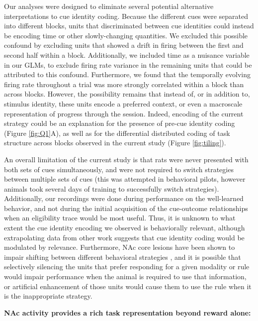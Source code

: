 \documentclass[11pt]{article}
\let\cite=\citep
\begin{document}
Our analyses were designed to eliminate several potential alternative
interpretations to cue identity coding. Because the different cues
were separated into different blocks, units that discriminated between
cue identities could instead be encoding time or other slowly-changing
quantities. We excluded this possible confound by excluding units that
showed a drift in firing between the first and second half within a
block. Additionally, we included time as a nuisance variable in our
GLMs, to exclude firing rate variance in the remaining units that
could be attributed to this confound. Furthermore, we found that the
temporally evolving firing rate throughout a trial was more strongly
correlated within a block than across blocks. However, the possibility
remains that instead of, or in addition to, stimulus identity, these
units encode a preferred context, or even a macroscale representation
of progress through the session. Indeed, encoding of the current
strategy could be an explanation for the presence of pre-cue identity
coding (Figure \ref{fig:Q1}A), as well as for the differential
distributed coding of task structure across blocks observed in the
current study (Figure \ref{fig:tiling}).

An overall limitation of the current study is that rats were never
presented with both sets of cues simultaneously, and were not required
to switch strategies between multiple sets of cues (this was attempted
in behavioral pilots, however animals took several days of training to
successfully switch strategies). Additionally, our recordings were
done during performance on the well-learned behavior, and not during
the initial acquisition of the cue-outcome relationships when an
eligibility trace would be most useful. Thus, it is unknown to what
extent the cue identity encoding we observed is behaviorally relevant,
although extrapolating data from other work \cite{Sleezer2016}
suggests that cue identity coding would be modulated by
relevance. Furthermore, NAc core lesions have been shown to impair
shifting between different behavioral strategies \cite{Floresco2006a},
and it is possible that selectively silencing the units that prefer
responding for a given modality or rule would impair performance when
the animal is required to use that information, or artificial
enhancement of those units would cause them to use the rule when it is
the inappropriate strategy.

{\bf NAc activity provides a rich task representation beyond reward alone:}
\end{document}
